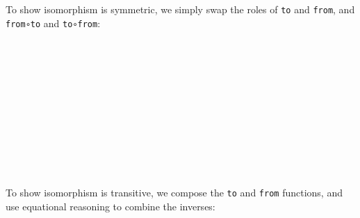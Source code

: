 To show isomorphism is symmetric, we simply swap the roles of
\texttt{to} and \texttt{from}, and \texttt{from∘to} and
\texttt{to∘from}:

\begin{fence}
\begin{code}%
\>[0]\AgdaSpace{}%
\AgdaSymbol{:}\AgdaSpace{}%
\AgdaSpace{}%
\AgdaSymbol{\{}\AgdaSpace{}%
\AgdaSpace{}%
\AgdaSymbol{:}\AgdaSpace{}%
\AgdaSymbol{\}}\<%
\\
\>[0][@{}l@{\AgdaIndent{0}}]%
\>[2]%
\>[442I]\AgdaSpace{}%
\AgdaSpace{}%
\<%
\\
\>[.][@{}l@{}]\<[442I]%
\>[4]\AgdaComment{-----}\<%
\\
%
\>[2]\AgdaSpace{}%
\AgdaSpace{}%
\AgdaSpace{}%
\<%
\\
\>[0]\AgdaSpace{}%
\AgdaSpace{}%
\AgdaSymbol{=}\<%
\\
\>[0][@{}l@{\AgdaIndent{0}}]%
\>[2]\<%
\\
\>[2][@{}l@{\AgdaIndent{0}}]%
\>[4]\AgdaSymbol{\{}\AgdaSpace{}%
%
\>[14]\AgdaSymbol{=}\AgdaSpace{}%
\AgdaSpace{}%
\<%
\\
%
\>[4]\AgdaSymbol{;}\AgdaSpace{}%
%
\>[14]\AgdaSymbol{=}\AgdaSpace{}%
%
\>[21]\<%
\\
%
\>[4]\AgdaSymbol{;}\AgdaSpace{}%
\AgdaSpace{}%
\AgdaSymbol{=}\AgdaSpace{}%
\AgdaSpace{}%
\<%
\\
%
\>[4]\AgdaSymbol{;}\AgdaSpace{}%
\AgdaSpace{}%
\AgdaSymbol{=}\AgdaSpace{}%
\AgdaSpace{}%
\<%
\\
%
\>[4]\AgdaSymbol{\}}\<%
\end{code}
\end{fence}

To show isomorphism is transitive, we compose the \texttt{to} and
\texttt{from} functions, and use equational reasoning to combine the
inverses:


